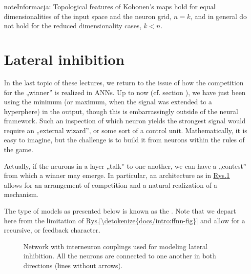 \documentclass[a4paper,12pt,polish]{jupyterBook}
\let\sphinxpxdimen\pdfpxdimen\else\newdimen\sphinxpxdimen
\begin{document}
\begin{sphinxadmonition}{note}{Informacja:}
\sphinxAtStartPar
Topological features of Kohonen’s maps hold for equal dimensionalities of the input space and the neuron grid, \(n=k\), and in general do not hold for the reduced dimensionality cases, \(k<n\).
\end{sphinxadmonition}


\section{Lateral inhibition}
\label{\detokenize{docs/som:lateral-inhibition}}\label{\detokenize{docs/som:lat-lab}}
\sphinxAtStartPar
In the last topic of these lectures, we return to the issue of how the competition for the „winner” is realized in ANNs. Up to now (cf. section {\hyperref[\detokenize{docs/unsupervised:inn-sec}]{}}), we have just been using the minimum (or maximum, when the signal was extended to a hyperphere) in the output, though this is embarrassingly outside of the neural framework. Such an inspection of which neuron yields the strongest signal would require an „external wizard”, or some sort of a control unit. Mathematically, it is easy to imagine, but the challenge is to build it from neurons within the rules of the game.

\sphinxAtStartPar
Actually, if the neurons in a layer „talk” to one another, we can have a „contest” from which a winner may emerge. In particular, an architecture as in \hyperref[\detokenize{docs/som:lat-fig}]{Rys.\@ \ref{\detokenize{docs/som:lat-fig}}} allows for an arrangement of competition and a natural realization of a  mechanism.

\sphinxAtStartPar
The type of models as presented below is known as the . Note that we depart here from the  limitation of \hyperref[\detokenize{docs/intro:ffnn-fig}]{Rys.\@ \ref{\detokenize{docs/intro:ffnn-fig}}} and allow for a recursive, or feed\sphinxhyphen{}back character.

\begin{figure}[htbp]
\centering
\capstart

\noindent\sphinxincludegraphics[width=220\sphinxpxdimen]{{lat3}.png}
\caption{Network with inter\sphinxhyphen{}neuron couplings used for modeling lateral inhibition. All the neurons are connected to one another in both directions (lines without arrows).}\label{\detokenize{docs/som:lat-fig}}\end{figure}
\end{document}
